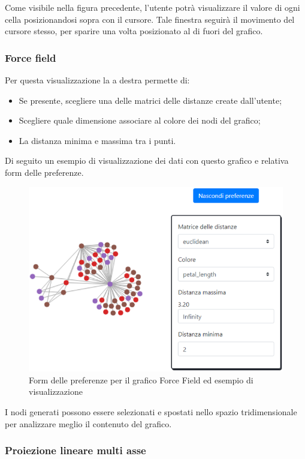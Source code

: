 Come visibile nella figura precedente, l'utente potrà visualizzare il valore di ogni cella posizionandosi sopra con il cursore. Tale finestra seguirà il movimento del cursore stesso, per sparire una volta posizionato al di fuori del grafico.

\newpage

\subsubsection{Force field}

Per questa visualizzazione la  a destra permette di:
\begin{itemize}
	\item Se presente, scegliere una delle matrici delle distanze create dall'utente;
	\item Scegliere quale dimensione associare al colore dei nodi del grafico;
	\item La distanza minima e massima tra i punti.
\end{itemize} 
Di seguito un esempio di visualizzazione dei dati con questo grafico e relativa form delle preferenze.

\begin{figure}[H]
		\includegraphics[scale=0.8]{Images/ffpf.png}
		\centering
		\caption{Form delle preferenze per il grafico Force Field ed esempio di visualizzazione}
\end{figure}
I nodi generati possono essere selezionati e spostati nello spazio tridimensionale
per analizzare meglio il contenuto del grafico.

\newpage
\subsubsection{Proiezione lineare multi asse}

